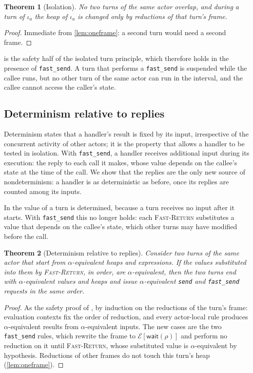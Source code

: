 \documentclass[11pt]{article}
\newtheorem{theorem}{Theorem}
\theoremstyle{definition}
\theoremstyle{remark}
\newcommand{\fs}{\texttt{fast\_send}}
\newcommand{\snd}{\texttt{send}}
\newcommand{\ctx}[1]{\mathcal{E}[#1]}
\newcommand{\wait}[1]{\mathsf{wait}(#1)}
\begin{document}
\begin{theorem}[Isolation]
\label{thm:isolation}
No two turns of the same actor overlap, and during a turn of $\iota_a$ the heap of
$\iota_a$ is changed only by reductions of that turn's frame.
\end{theorem}
\begin{proof}
Immediate from \cref{lem:oneframe}: a second turn would need a second frame.
\end{proof}

 is the safety half of the isolated turn principle, which therefore
holds in the presence of \fs{}. A turn that performs a \fs{} is suspended while the
callee runs, but no other turn of the same actor can run in the interval, and the callee
cannot access the caller's state.

\subsection{Determinism relative to replies}
\label{sec:det}

Determinism states that a handler's result is fixed by its input, irrespective of the
concurrent activity of other actors; it is the property that allows a handler to be
tested in isolation. With \fs{}, a handler receives additional input during its
execution: the reply to each call it makes, whose value depends on the callee's state at
the time of the call. We show that the replies are the only new source of
nondeterminism: a handler is as deterministic as before, once its replies are counted
among its inputs.


In \cite{dekoster2024} the value of a turn is determined, because a turn receives no
input after it starts. With \fs{} this no longer holds: each \textsc{Fast-Return}
substitutes a value that depends on the callee's state, which other turns may have
modified before the call.

\begin{theorem}[Determinism relative to replies]
\label{thm:determinism}
Consider two turns of the same actor that start from $\alpha$-equivalent heaps and
expressions. If the values substituted into them by \textsc{Fast-Return}, in order, are
$\alpha$-equivalent, then the two turns end with $\alpha$-equivalent values and heaps and
issue $\alpha$-equivalent \snd{} and \fs{} requests in the same order.
\end{theorem}
\begin{proof}
As the safety proof of \cite{dekoster2024}, by induction on the reductions of the turn's
frame: evaluation contexts fix the order of reduction, and every actor-local rule
produces $\alpha$-equivalent results from $\alpha$-equivalent inputs. The new cases are
the two \fs{} rules, which rewrite the frame to $\ctx{\wait{\rho}}$ and perform no
reduction on it until \textsc{Fast-Return}, whose substituted value is
$\alpha$-equivalent by hypothesis. Reductions of other frames do not touch this turn's
heap (\cref{lem:oneframe}).
\end{proof}
\end{document}
